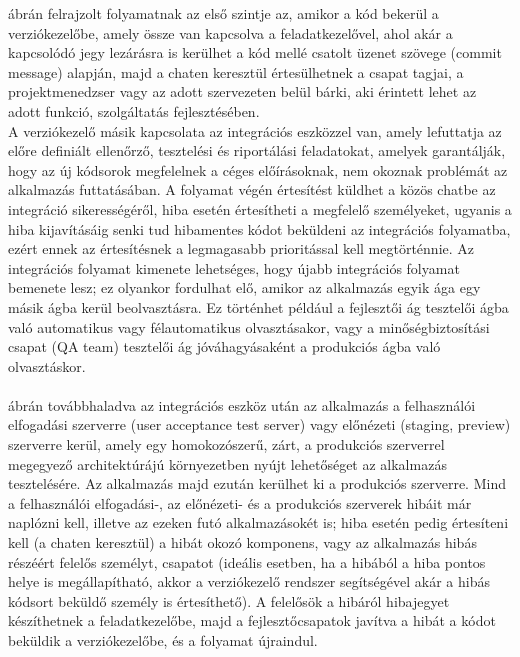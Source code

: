  ábrán felrajzolt folyamatnak az első szintje az, amikor a kód bekerül a verziókezelőbe, amely össze van kapcsolva a feladatkezelővel, ahol akár a kapcsolódó jegy lezárásra is kerülhet a kód mellé csatolt üzenet szövege (commit message) alapján, majd a chaten keresztül értesülhetnek a csapat tagjai, a projektmenedzser vagy az adott szervezeten belül bárki, aki érintett lehet az adott funkció, szolgáltatás fejlesztésében.\\
A verziókezelő másik kapcsolata az integrációs eszközzel van, amely lefuttatja az előre definiált ellenőrző, tesztelési és riportálási feladatokat, amelyek garantálják, hogy az új kódsorok megfelelnek a céges előírásoknak, nem okoznak problémát az alkalmazás futtatásában. A folyamat végén értesítést küldhet a közös chatbe az integráció sikerességéről, hiba esetén értesítheti a megfelelő személyeket, ugyanis a hiba kijavításáig senki tud hibamentes kódot beküldeni az integrációs folyamatba, ezért ennek az értesítésnek a legmagasabb prioritással kell megtörténnie. Az integrációs folyamat kimenete lehetséges, hogy újabb integrációs folyamat bemenete lesz; ez olyankor fordulhat elő, amikor az alkalmazás egyik ága egy másik ágba kerül beolvasztásra. Ez történhet például a fejlesztői ág tesztelői ágba való automatikus vagy félautomatikus olvasztásakor, vagy a minőségbiztosítási csapat (QA team) tesztelői ág jóváhagyásaként a produkciós ágba való olvasztáskor.\\
\hfill\\
 ábrán továbbhaladva az integrációs eszköz után az alkalmazás a felhasználói elfogadási szerverre (user acceptance test server) vagy előnézeti (staging, preview) szerverre kerül, amely egy homokozószerű, zárt, a produkciós szerverrel megegyező architektúrájú környezetben nyújt lehetőséget az alkalmazás tesztelésére. Az alkalmazás majd ezután kerülhet ki a produkciós szerverre. Mind a felhasználói elfogadási-, az előnézeti- és a produkciós szerverek hibáit már naplózni kell, illetve az ezeken futó alkalmazásokét is; hiba esetén pedig értesíteni kell (a chaten keresztül) a hibát okozó komponens, vagy az alkalmazás hibás részéért felelős személyt, csapatot (ideális esetben, ha a hibából a hiba pontos helye is megállapítható, akkor a verziókezelő rendszer segítségével akár a hibás kódsort beküldő személy is értesíthető). A felelősök a hibáról hibajegyet készíthetnek a feladatkezelőbe, majd a fejlesztőcsapatok javítva a hibát a kódot beküldik a verziókezelőbe, és a folyamat újraindul.\\
